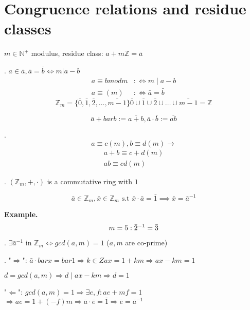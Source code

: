 \section{Congruence relations and residue classes}

\begin{definition}
$m \in \mathbb{N}^{+}$ modulus, 
residue class: $a+m \mathbb{Z} = \overline{a}$ 
\end{definition}

\Remark.
$a\in \bar{a}, \bar{a} = \bar{b} \iff m | a-b$
\begin{align*}
  a \equiv b mod m & :\iff m \mid a-b \\
  a \equiv (m)     & :\iff \bar{a} = \bar{b}
\end{align*}
\[
  \mathbb{Z}_m = \{ \bar{0},\bar{1},\bar{2}, \ldots, \bar{m-1}\} 
  \bar{0} \cup \bar{1} \cup \bar{2} \cup  \ldots \cup \bar{m-1} = \mathbb{Z}
\]


\begin{definition}
\[
  \bar{a} + bar{b} := \bar{a+b}, \bar{a} \cdot \bar{b} := \bar{ab}
\]
\end{definition}

\Remark.
\[
  a \equiv c(m), b \equiv d(m) \rightarrow 
\]
\begin{align*}
  a+b \equiv c+d(m) \\
  ab \equiv cd (m)
\end{align*}

\Theorem.
$(\mathbb{Z}_m, + , \cdot)$ is a commutative ring with $1$

\begin{definition}
\[
  \bar{a} \in \mathbb{Z}_m, \bar{x} \in \mathbb{Z}_m \text{ s.t }
  \bar{x} \cdot \bar{a} = \bar{1} \implies \bar{x} = \bar{a}^{-1}
\]
\end{definition}

\textbf{Example.}
\[
  m = 5: \bar{2}^{-1} = \bar{3} \\
\]

\Theorem.
$\exists \bar{a}^{-1} \text{ in } \mathbb{Z}_m \iff gcd(a,m) = 1$ ($a,m$ are co-prime)

\Proof.
"$\Rightarrow$": 
  $\bar{a}\cdot bar{x} = bar{1} \Rightarrow k\in Z 
  ax = 1 + km \Rightarrow ax - km = 1$

  $d = gcd(a,m) \Rightarrow d \mid ax - km \Rightarrow d = 1$

"$\Leftarrow$":
  $gcd(a,m) = 1 \Rightarrow \exists e,f : ae + mf = 1$ \\
  $\Rightarrow ae = 1 + (-f)m \Rightarrow \bar{a} \cdot \bar{e} = \bar{1} \Rightarrow \bar{e} = \bar{a}^{-1}$

